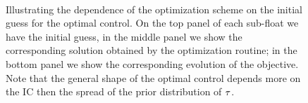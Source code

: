 \documentclass{article}
\begin{document}
\begin{figure}[h]
\begin{center}  
\\
\caption[Dependence on initial guess for control]{Illustrating the dependence
of the optimization scheme on the initial guess for the optimal control. 
On the top panel of each sub-float we have the initial guess, in the middle
panel we show the corresponding solution obtained by the optimization routine;
in the bottom panel we show the corresponding evolution of the objective. Note
that the general shape of the optimal control depends more on the IC then the
spread of the prior distribution of ${ \tau }$.}
\label{fig:ICs_for_control}
\end{center}
\end{figure}
\end{document}
